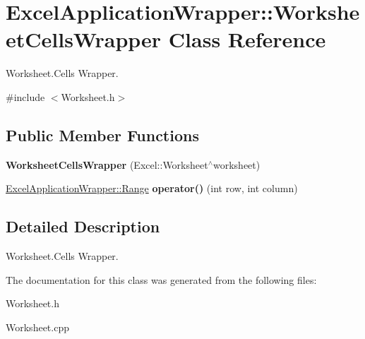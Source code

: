 \hypertarget{class_excel_application_wrapper_1_1_worksheet_cells_wrapper}{}\section{Excel\+Application\+Wrapper\+:\+:Worksheet\+Cells\+Wrapper Class Reference}
\label{class_excel_application_wrapper_1_1_worksheet_cells_wrapper}


Worksheet.\+Cells Wrapper.  




{\ttfamily \#include $<$Worksheet.\+h$>$}

\subsection*{Public Member Functions}
\begin{DoxyCompactItemize}
\item 
\hypertarget{class_excel_application_wrapper_1_1_worksheet_cells_wrapper_a7eecb2c92a0089c6b032df663ca41a68}{}{\bfseries Worksheet\+Cells\+Wrapper} (Excel\+::\+Worksheet$^\wedge$worksheet)\label{class_excel_application_wrapper_1_1_worksheet_cells_wrapper_a7eecb2c92a0089c6b032df663ca41a68}

\item 
\hypertarget{class_excel_application_wrapper_1_1_worksheet_cells_wrapper_ad145efccd49234bbdc7d4b81217c18c3}{}\hyperlink{class_excel_application_wrapper_1_1_range}{Excel\+Application\+Wrapper\+::\+Range} {\bfseries operator()} (int row, int column)\label{class_excel_application_wrapper_1_1_worksheet_cells_wrapper_ad145efccd49234bbdc7d4b81217c18c3}

\end{DoxyCompactItemize}


\subsection{Detailed Description}
Worksheet.\+Cells Wrapper. 

The documentation for this class was generated from the following files\+:\begin{DoxyCompactItemize}
\item 
Worksheet.\+h\item 
Worksheet.\+cpp\end{DoxyCompactItemize}
